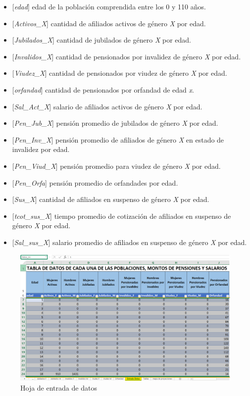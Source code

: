 \documentclass[
  letterpaper,
  DIV=11,
  numbers=noendperiod]{scrreprt}
\providecommand{\tightlist}{%
  \setlength{\itemsep}{0pt}\setlength{\parskip}{0pt}}\usepackage{longtable,booktabs,array}
\begin{document}
\begin{itemize}
\tightlist
\item
  {[}\emph{edad}{]} edad de la población comprendida entre los 0 y 110
  años.
\item
  {[}\emph{Activos\_X}{]} cantidad de afiliados activos de género
  \emph{X} por edad.
\item
  {[}\emph{Jubilados\_X}{]} cantidad de jubilados de género \emph{X} por
  edad.
\item
  {[}\emph{Invalidos\_X}{]} cantidad de pensionados por invalidez de
  género \emph{X} por edad.
\item
  {[}\emph{Viudez\_X}{]} cantidad de pensionados por viudez de género
  \emph{X} por edad.
\item
  {[}\emph{orfandad}{]} cantidad de pensionados por orfandad de edad
  \emph{x}.
\item
  {[}\emph{Sal\_Act\_X}{]} salario de afiliados activos de género
  \emph{X} por edad.
\item
  {[}\emph{Pen\_Jub\_X}{]} pensión promedio de jubilados de género
  \emph{X} por edad.
\item
  {[}\emph{Pen\_Inv\_X}{]} pensión promedio de afiliados de género
  \emph{X} en estado de invalidez por edad.
\item
  {[}\emph{Pen\_Viud\_X}{]} pensión promedio para viudez de género
  \emph{X} por edad.
\item
  {[}\emph{Pen\_Orfa}{]} pensión promedio de orfandades por edad.
\item
  {[}\emph{Sus\_X}{]} cantidad de afiliados en suspenso de género
  \emph{X} por edad.
\item
  {[}\emph{tcot\_sus\_X}{]} tiempo promedio de cotización de afiliados
  en suspenso de género \emph{X} por edad.
\item
  {[}\emph{Sal\_sus\_X}{]} salario promedio de afiliados en suspenso de
  género \emph{X} por edad.
\end{itemize}

\begin{figure}

{\centering \includegraphics{images/F/Img1.png}

}

\caption{Hoja de entrada de datos}

\end{figure}
\end{document}
